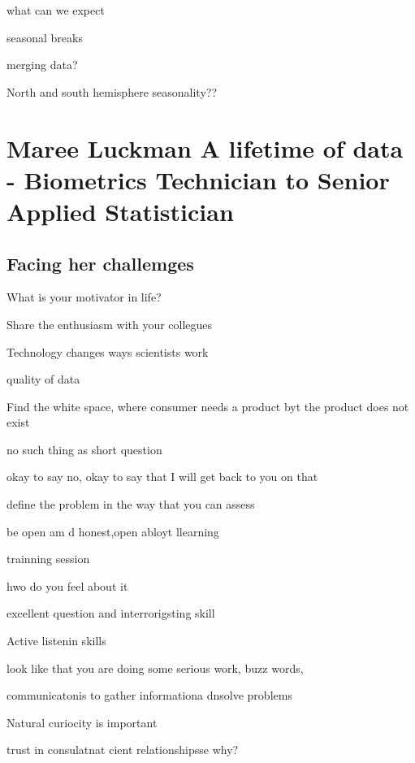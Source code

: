 \documentclass[
]{book}
\begin{document}
what can we expect

seasonal breaks

merging data?

North and south hemisphere seasonality??

\hypertarget{maree-luckman-a-lifetime-of-data---biometrics-technician-to-senior-applied-statistician}{%
\chapter*{Maree Luckman \textbar{} A lifetime of data - Biometrics Technician to Senior Applied Statistician}\label{maree-luckman-a-lifetime-of-data---biometrics-technician-to-senior-applied-statistician}}

\hypertarget{facing-her-challemges}{%
\section{Facing her challemges}\label{facing-her-challemges}}

What is your motivator in life?

Share the enthusiasm with your collegues

Technology changes ways scientists work

quality of data

Find the white space, where consumer needs a product byt the product does not exist

no such thing as short question

okay to say no, okay to say that I will get back to you on that

define the problem in the way that you can assess

be open am d honest,open abloyt llearning

trainning session

hwo do you feel about it

excellent question and interrorigsting skill

Active listenin skills

look like that you are doing some serious work, buzz words,

communicatonis to gather informationa dnsolve problems

Natural curiocity is important

trust in consulatnat cient relationshipsse why?
\end{document}

